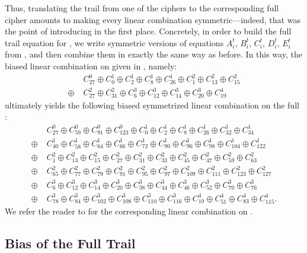 \documentclass{llncs}
\begin{document}
Thus, translating the trail from one of the  ciphers to the corresponding full  cipher amounts to making every linear combination symmetric---indeed, that was the point of introducing  in the first place.
Concretely, in order to build the full trail equation for , we write symmetric versions of equations $A^t_i$, $B^t_i$, $C^t_i$, $D^t_i$, $E^t_i$ from , and then combine them in exactly the same way as before.
In this way, the biased linear combination on  given in , namely:
\begin{align*}
&C^0_{27} \oplus C^1_{0} \oplus C^1_{2} \oplus C^1_{8} \oplus C^1_{26} \oplus C^2_{1} \oplus C^2_{13} \oplus C^2_{15}\\
\oplus\; &C^2_{27} \oplus C^2_{31} \oplus C^3_{6} \oplus C^3_{12} \oplus C^3_{14} \oplus C^3_{20} \oplus C^4_{19}
\end{align*}
ultimately yields the following biased symmetrized linear combination on the full :
\begin{align*}
&C^0_{27} \oplus C^0_{59} \oplus C^0_{91} \oplus C^0_{123} \oplus C^1_{0} \oplus C^1_{2} \oplus C^1_{8} \oplus C^1_{26} \oplus C^1_{32} \oplus C^1_{34}\\
\oplus\; & C^1_{40} \oplus C^1_{58} \oplus C^1_{64} \oplus C^1_{66} \oplus C^1_{72} \oplus C^1_{90} \oplus C^1_{96} \oplus C^1_{98} \oplus C^1_{104} \oplus C^1_{122}\\
\oplus\; & C^2_{1} \oplus C^2_{13} \oplus C^2_{15} \oplus C^2_{27} \oplus C^2_{31} \oplus C^2_{33} \oplus C^2_{45} \oplus C^2_{47} \oplus C^2_{59} \oplus C^2_{63}\\
\oplus\; & C^2_{65} \oplus C^2_{77} \oplus C^2_{79} \oplus C^2_{91} \oplus C^2_{95} \oplus C^2_{97} \oplus C^2_{109} \oplus C^2_{111} \oplus C^2_{123} \oplus C^2_{127}\\
\oplus\; & C^3_{6} \oplus C^3_{12} \oplus C^3_{14} \oplus C^3_{20} \oplus C^3_{38} \oplus C^3_{44} \oplus C^3_{46} \oplus C^3_{52} \oplus C^3_{70} \oplus C^3_{76}\\
\oplus\; & C^3_{78} \oplus C^3_{84} \oplus C^3_{102} \oplus C^3_{108} \oplus C^3_{110} \oplus C^3_{116} \oplus C^4_{19} \oplus C^4_{51} \oplus C^4_{83} \oplus C^4_{115}.
\end{align*}
We refer the reader to  for the corresponding linear combination on .

\subsection{Bias of the Full Trail}
\end{document}
